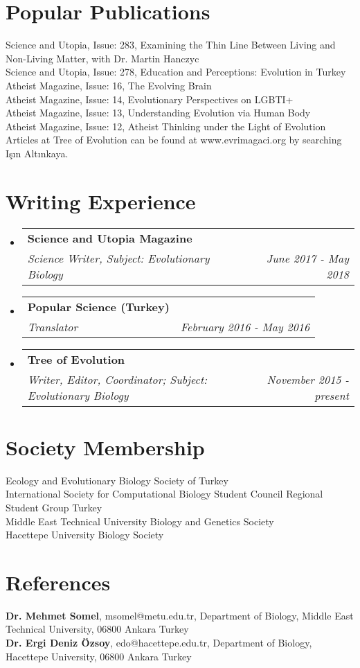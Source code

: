 \documentclass[letterpaper,11pt]{article}
\makeatletter
\newcommand{\resumeSubheading}[4]{
  \vspace{-1pt}\item
    \begin{tabular*}{0.97\textwidth}{l@{\extracolsep{\fill}}r}
      \textbf{#1} & #2 \\
      \textit{\small#3} & \textit{\small #4} \\
    \end{tabular*}\vspace{-5pt}
}
\newcommand{\resumeSubHeadingListStart}{\begin{itemize}[leftmargin=*]}
\newcommand{\resumeSubHeadingListEnd}{\end{itemize}}
\makeatother
\begin{document}
\section{Popular Publications}
Science and Utopia, Issue: 283, Examining the Thin Line Between Living and Non-Living Matter, with Dr. Martin Hanczyc \\
Science and Utopia, Issue: 278, Education and Perceptions: Evolution in Turkey \\
Atheist Magazine, Issue: 16, The Evolving Brain \\
Atheist Magazine, Issue: 14, Evolutionary Perspectives on LGBTI+ \\
Atheist Magazine, Issue: 13, Understanding Evolution via Human Body \\
Atheist Magazine, Issue: 12, Atheist Thinking under the Light of Evolution \\
Articles at Tree of Evolution can be found at www.evrimagaci.org by searching I\c{s}{\i}n Alt{\i}nkaya. 

\section{Writing Experience}
  \resumeSubHeadingListStart
    \resumeSubheading
      {Science and Utopia Magazine}{ }
      {Science Writer, Subject: Evolutionary Biology}{June 2017 - May 2018}
    \resumeSubheading
      {Popular Science (Turkey)}{ }
      {Translator}{February 2016 - May 2016}
    \resumeSubheading
      {Tree of Evolution}{ }
      {Writer, Editor, Coordinator; Subject: Evolutionary Biology}{November 2015 - present}
  \resumeSubHeadingListEnd

\section{Society Membership}		
Ecology and Evolutionary Biology Society of Turkey \\
International Society for Computational Biology Student Council Regional Student Group Turkey \\
Middle East Technical University Biology and Genetics Society \\
Hacettepe University Biology Society

\section{References}		
\textbf{Dr. Mehmet Somel}, msomel@metu.edu.tr, Department of Biology, Middle East Technical University, 06800 Ankara Turkey \\
\textbf{Dr. Ergi Deniz \"{O}zsoy}, edo@hacettepe.edu.tr, Department of Biology, Hacettepe University, 06800 Ankara Turkey  \\

\end{document}
